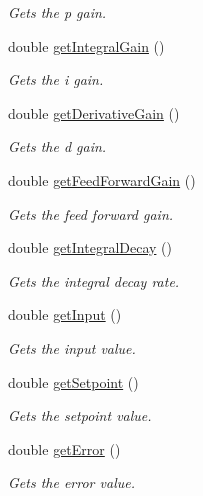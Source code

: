 \begin{DoxyCompactItemize}
\begin{DoxyCompactList}\small\item\em Gets the p gain. \end{DoxyCompactList}\item 
double \hyperlink{class_rhesus_1_1_toolkit_1_1_control_1_1_p_i_d_a5627825f6b9ef28b23c5a4dcf89faf1f}{get\-Integral\-Gain} ()
\begin{DoxyCompactList}\small\item\em Gets the i gain. \end{DoxyCompactList}\item 
double \hyperlink{class_rhesus_1_1_toolkit_1_1_control_1_1_p_i_d_a79fcedef4f3cb756e393643a6b26d72e}{get\-Derivative\-Gain} ()
\begin{DoxyCompactList}\small\item\em Gets the d gain. \end{DoxyCompactList}\item 
double \hyperlink{class_rhesus_1_1_toolkit_1_1_control_1_1_p_i_d_a2ec7c5a35585baaf864da7e1871fcd2f}{get\-Feed\-Forward\-Gain} ()
\begin{DoxyCompactList}\small\item\em Gets the feed forward gain. \end{DoxyCompactList}\item 
double \hyperlink{class_rhesus_1_1_toolkit_1_1_control_1_1_p_i_d_aa164ad9b11c414655620cd5453f7b184}{get\-Integral\-Decay} ()
\begin{DoxyCompactList}\small\item\em Gets the integral decay rate. \end{DoxyCompactList}\item 
double \hyperlink{class_rhesus_1_1_toolkit_1_1_control_1_1_p_i_d_ad25c23924ac1f5ba70d192d09fb0be61}{get\-Input} ()
\begin{DoxyCompactList}\small\item\em Gets the input value. \end{DoxyCompactList}\item 
double \hyperlink{class_rhesus_1_1_toolkit_1_1_control_1_1_p_i_d_a7c05501c606490ce708cbfbbebe18511}{get\-Setpoint} ()
\begin{DoxyCompactList}\small\item\em Gets the setpoint value. \end{DoxyCompactList}\item 
double \hyperlink{class_rhesus_1_1_toolkit_1_1_control_1_1_p_i_d_afab1724ee3007eb4d690ad58aa218b2b}{get\-Error} ()
\begin{DoxyCompactList}\small\item\em Gets the error value. \end{DoxyCompactList}\item 

\end{DoxyCompactItemize}
